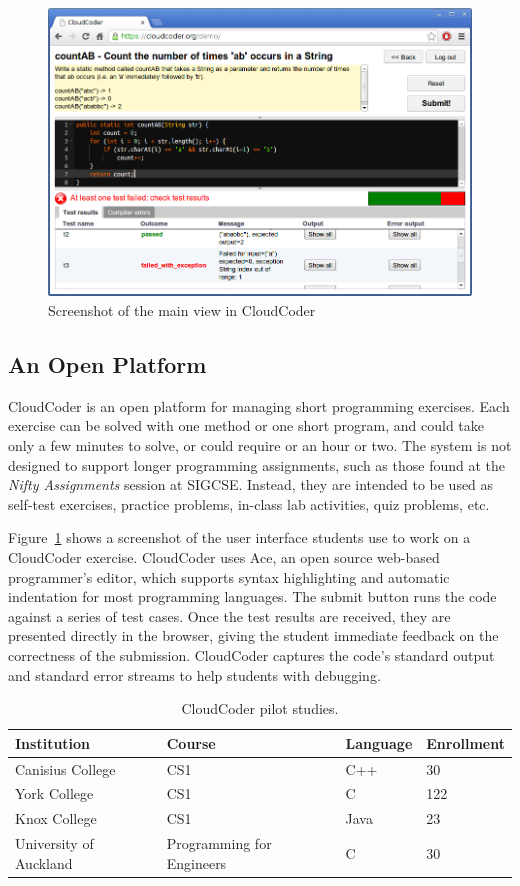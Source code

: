 \documentclass{sig-alternate}
\begin{document}
\begin{figure}
\centering
\includegraphics[width=5.5in]{images/screenshot4}
\caption{Screenshot of the main view in CloudCoder}
\label{screenshot}
\end{figure}


\subsection{An Open Platform}

CloudCoder is an open platform for managing short programming
exercises.
Each exercise can be solved with one method or one short
program, and could take only a few minutes to solve, or could require
or an hour or two.  The system is not designed to support longer
programming assignments, such as those found at the {\em Nifty
Assignments} session at SIGCSE\cite{Parlante:2013:NA:2445196.2445356}.
Instead, they are intended to be used as self-test exercises,
practice problems, in-class lab activities, quiz problems, etc.

Figure~\ref{screenshot} shows a screenshot of the user interface
students use to work on a CloudCoder exercise.
CloudCoder uses Ace\cite{ace}, an open source web-based
programmer's editor, which supports
syntax highlighting and automatic indentation for most programming languages.
The submit button runs the code against a series of
test cases. Once the test results are received, they are presented
directly in the browser, giving the student immediate feedback on the
correctness of the submission.
CloudCoder captures the code's standard output and
standard error streams to help students with debugging.

\begin{table}
\centering
\begin{tabular}{llll}
\toprule
Institution & Course & Language & Enrollment\\
\midrule
Canisius College & CS1 & C++ & 30\\
York College & CS1 & C & 122\\
Knox College & CS1 & Java & 23\\
University of Auckland & Programming for Engineers & C & 30\\
\bottomrule
\end{tabular}
\caption{CloudCoder pilot studies.}
\label{tab:courses}
\end{table}
\end{document}
